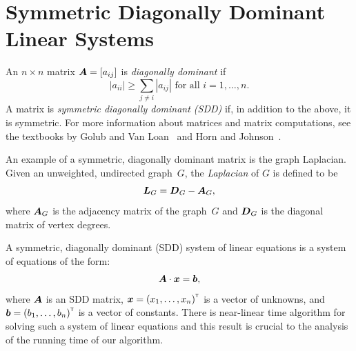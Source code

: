 \section{Symmetric Diagonally Dominant Linear Systems}

An $n \times n$ matrix $\boldsymbol{A} = [a_{ij}]$ is \emph{diagonally dominant} if 
\[
	|a_{ii}| \geq \sum_{j \neq i} {|a_{ij}|} \mbox{ for all } i = 1, \ldots, n.
\] 
A matrix is \emph{symmetric diagonally dominant (SDD)} if, in addition to the above, 
it is symmetric. For more information about matrices and matrix computations, 
see the textbooks by Golub and Van Loan~\cite{GvL13} and Horn and Johnson~\cite{HJ13}. 

An example of a symmetric, diagonally dominant matrix is the graph Laplacian. 
Given an unweighted, undirected graph~$G$, the \emph{Laplacian} of $G$ 
is defined to be 
\[
\boldsymbol{L}_G = \boldsymbol{D}_G - \boldsymbol{A}_G,
\] 
where $\boldsymbol{A}_G$ is the adjacency matrix of the graph~$G$ and $\boldsymbol{D}_G$ 
is the diagonal matrix of vertex degrees. 

A symmetric, diagonally dominant (SDD) system of linear equations is a system of 
equations of the form:
\[
	\boldsymbol{A} \cdot \boldsymbol{x} = \boldsymbol{b},
\]
where $\boldsymbol{A}$ is an SDD matrix, $\boldsymbol{x} = {(x_1, \ldots, x_n)}^{\scriptscriptstyle \mathsf{T}}$ 
is a vector of unknowns, and $\boldsymbol{b} = {(b_1, \ldots, b_n)}^{\scriptscriptstyle \mathsf{T}}$ is a vector of constants. 
There is near-linear time algorithm for solving such a system of linear equations 
and this result is crucial to the analysis of the running time of our algorithm. 

